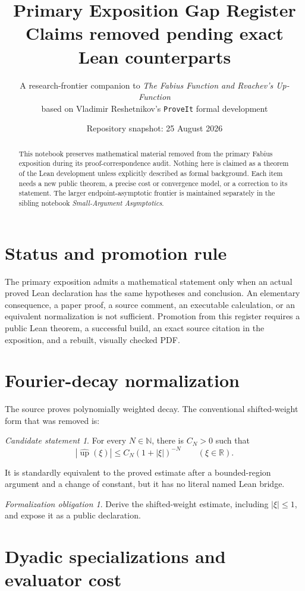 \documentclass[11pt,oneside]{article}
\title{\bfseries Primary Exposition Gap Register\\[0.35em]
\large Claims removed pending exact Lean counterparts}
\author{A research-frontier companion to
\emph{The Fabius Function and Rvachev's Up-Function}\\
\small based on Vladimir Reshetnikov's \texttt{ProveIt} formal development}
\date{Repository snapshot: 25 August 2026}
\theoremstyle{definition}
\theoremstyle{remark}
\newcommand{\R}{\mathbb R}
\newcommand{\N}{\mathbb N}
\newcommand{\Up}{\operatorname{up}}
\newtheorem{candidate}[theorem]{Candidate statement}
\newtheorem{obligation}[theorem]{Formalization obligation}
\begin{document}
\maketitle
\begin{abstract}
This notebook preserves mathematical material removed from the primary Fabius exposition
during its proof-correspondence audit.  Nothing here is claimed as a theorem of the Lean
development unless explicitly described as formal background.  Each item needs a new
public theorem, a precise cost or convergence model, or a correction to its statement.
The larger endpoint-asymptotic frontier is maintained separately in the sibling notebook
\emph{Small-Argument Asymptotics}.
\end{abstract}
\tableofcontents
\newpage

\section{Status and promotion rule}

The primary exposition admits a mathematical statement only when an actual proved Lean
declaration has the same hypotheses and conclusion.  An elementary consequence, a paper
proof, a source comment, an executable calculation, or an equivalent normalization is not
sufficient.  Promotion from this register requires a public Lean theorem, a successful
build, an exact source citation in the exposition, and a rebuilt, visually checked PDF.

\section{Fourier-decay normalization}

The source proves polynomially weighted decay.  The conventional shifted-weight form that
was removed is:
\begin{candidate}
For every \(N\in\N\), there is \(C_N>0\) such that
\[
 |\widehat{\Up}(\xi)|\le C_N(1+|\xi|)^{-N}\qquad(\xi\in\R).
\]
\end{candidate}
It is standardly equivalent to the proved estimate after a bounded-region argument and a
change of constant, but it has no literal named Lean bridge.
\begin{obligation}
Derive the shifted-weight estimate, including \(|\xi|\le1\), and expose it as a public
declaration.
\end{obligation}

\section{Dyadic specializations and evaluator cost}
\end{document}
